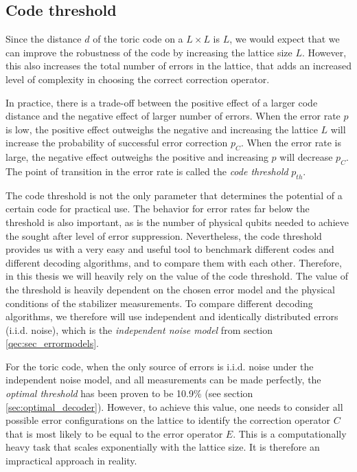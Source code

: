 \subsection{Code threshold}
Since the distance $d$ of the toric code on a $L\times L$ is $L$, we would expect that we can improve the robustness of the code by increasing the lattice size $L$. However, this also increases the total number of errors in the lattice, that adds an increased level of complexity in choosing the correct correction operator.

In practice, there is a trade-off between the positive effect of a larger code distance and the negative effect of larger number of errors. When the error rate $p$ is low, the positive effect outweighs the negative and increasing the lattice $L$ will increase the probability of successful error correction $p_C$. When the error rate is large, the negative effect outweighs the positive and increasing $p$ will decrease $p_C$. The point of transition in the error rate is called the \emph{code threshold} $p_{th}$.

The code threshold is not the only parameter that determines the potential of a certain code for practical use. The behavior for error rates far below the threshold is also important, as is the number of physical qubits needed to achieve the sought after level of error suppression. Nevertheless, the code threshold provides us with a very easy and useful tool to benchmark different codes and different decoding algorithms, and to compare them with each other. Therefore, in this thesis we will heavily rely on the value of the code threshold. The value of the threshold is heavily dependent on the chosen error model and the physical conditions of the stabilizer measurements. To compare different decoding algorithms, we therefore will use independent and identically distributed errors (i.i.d. noise), which is the \emph{independent noise model} from section \ref{qec:sec_errormodels}.

For the toric code, when the only source of errors is i.i.d. noise under the independent noise model, and all measurements can be made perfectly, the \emph{optimal threshold} has been proven to be 10.9\% (see section \ref{sec:optimal_decoder}). However, to achieve this value, one needs to consider all possible error configurations on the lattice to identify the correction operator $C$ that is most likely to be equal to the error operator $E$. This is a computationally heavy task that scales exponentially with the lattice size. It is therefore an impractical approach in reality.

